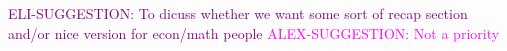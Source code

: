 \documentclass{article}
\theoremstyle{definition}
\newcommand{\ESUG}[1]{\textcolor{purple}{ELI-SUGGESTION: #1}}
\newcommand{\ASUG}[1]{\textcolor{magenta}{ALEX-SUGGESTION: #1}}
\begin{document}

\ESUG{To dicuss whether we want some sort of recap section and/or nice version for econ/math people}
\ASUG{Not a priority}
\end{document}
